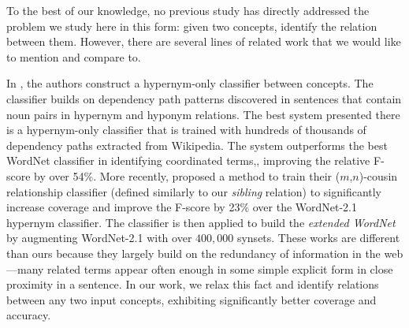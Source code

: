 To the best of our knowledge, no previous study has directly addressed
the problem we study here in this form: given two concepts, identify
the relation between them. However, there are several lines of related
work that we would like to mention and compare to.


In \cite{ilprints665}, the authors construct a hypernym-only
classifier between concepts. The classifier builds on dependency path
patterns discovered in sentences that contain noun pairs in hypernym
and hyponym relations. The best system presented there is a
hypernym-only classifier that is trained with hundreds of thousands of
dependency paths extracted from Wikipedia. The system outperforms the
best WordNet classifier in identifying coordinated terms,, improving
the relative F-score by over 54\%. More recently, \cite{Snow2006}
proposed a method to train their ($m$,$n$)-cousin relationship
classifier (defined similarly to our {\em sibling} relation) to
significantly increase coverage and improve the F-score by 23\%
over the WordNet-2.1 hypernym classifier. The classifier is then
applied to build the {\em extended WordNet} by augmenting WordNet-2.1
with over $400,000$ synsets.  These works are different than ours
because they largely build on the redundancy of information in the
web---many related terms appear often enough in some simple explicit
form in close proximity in a sentence. In our work, we relax this fact
and identify relations between any two input concepts, exhibiting
significantly better coverage and accuracy.

